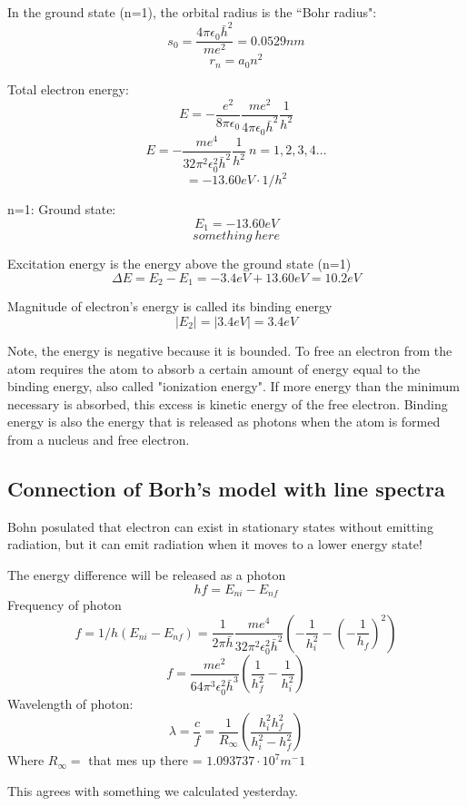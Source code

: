 \documentclass[class=article,crop=false]{standalone}
\begin{document}
\begin{question}
	In the ground state (n=1), the orbital radius is the ``Bohr radius":
	\[ s_0 = \frac{4\pi\epsilon_0\bar{h}^2}{me^2} = 0.0529 nm \]
	$$r_n = a_0 n^2 $$

	Total electron energy:
	\[ E = -\frac{e^2}{8\pi\epsilon_0} \frac{me^2}{4\pi\epsilon_0\bar{h}^2} \frac{1}{h^2} \]
	$$ E = -\frac{me^4}{32\pi^2\epsilon_0^2\bar{h}^2} \frac{1}{h^2}\ n=1,2,3,4...$$
	$$ = -13.60 eV \cdot 1/h^2 $$

	n=1: Ground state:
	\[ E_1 = -13.60 eV \]
	$$something\ here$$

	Excitation energy is the energy above the ground state (n=1)
	\[\Delta E = E_2 - E_1 = -3.4 eV + 13.60 eV = 10.2 eV \]

	Magnitude of electron's energy is called its binding energy
	$$ |E_2| = |3.4 eV| = 3.4 eV $$
	
\end{question}
Note, the energy is negative because it is bounded. To free an electron from the atom requires the atom to absorb a certain amount of energy equal to the binding energy, also called "ionization energy". If more energy than the minimum necessary is absorbed, this excess is kinetic energy of the free electron. Binding energy is also the energy that is released as photons when the atom is formed from a nucleus and free electron.\\

\subsection{Connection of Borh's model with line spectra}
Bohn posulated that electron can exist in stationary states without emitting radiation, but it can emit radiation when it moves to a lower energy state!\\

\begin{question}[If the electron jumps from the $n=n_i$ to $n=n_f$ state]
	The energy difference will be released as a photon
	$$ hf = E_{ni} - E_{nf} $$
	Frequency of photon
	\[ f = 1/h (E_{ni} - E_{nf}) = \frac{1}{2\pi\bar{h}} \frac{me^4}{32\pi^2\epsilon_0^2\bar{h}^2} \left(-\frac{1}{h_i^2} - \left(- \frac{1}{h_f}\right)^2\right) \]
	$$f = \frac{me^2}{64\pi^3\epsilon_0^2\bar{h}^3}\left(\frac{1}{h_f^2}-\frac{1}{h_i^2}\right) $$
	Wavelength of photon:
	$$ \lambda = \frac{c}{f} = \frac{1}{R_\infty} \left(\frac{h_i^2h_f^2}{h_i^2-h_f^2}\right) $$
	Where $R_\infty = $ that mes up there = $1.093737 \cdot 10^7 m^-1 $

\end{question}
This agrees with something we calculated yesterday.
\end{document}
